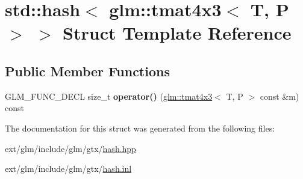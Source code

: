 \hypertarget{structstd_1_1hash_3_01glm_1_1tmat4x3_3_01_t_00_01_p_01_4_01_4}{\section{std\-:\-:hash$<$ glm\-:\-:tmat4x3$<$ T, P $>$ $>$ Struct Template Reference}
\label{structstd_1_1hash_3_01glm_1_1tmat4x3_3_01_t_00_01_p_01_4_01_4}
}
\subsection*{Public Member Functions}
\begin{DoxyCompactItemize}
\item 
\hypertarget{structstd_1_1hash_3_01glm_1_1tmat4x3_3_01_t_00_01_p_01_4_01_4_ab9391ba8e81bfc70e69a7334cfa8a059}{G\-L\-M\-\_\-\-F\-U\-N\-C\-\_\-\-D\-E\-C\-L size\-\_\-t {\bfseries operator()} (\hyperlink{structglm_1_1tmat4x3}{glm\-::tmat4x3}$<$ T, P $>$ const \&m) const }\label{structstd_1_1hash_3_01glm_1_1tmat4x3_3_01_t_00_01_p_01_4_01_4_ab9391ba8e81bfc70e69a7334cfa8a059}

\end{DoxyCompactItemize}


The documentation for this struct was generated from the following files\-:\begin{DoxyCompactItemize}
\item 
ext/glm/include/glm/gtx/\hyperlink{hash_8hpp}{hash.\-hpp}\item 
ext/glm/include/glm/gtx/\hyperlink{hash_8inl}{hash.\-inl}\end{DoxyCompactItemize}
